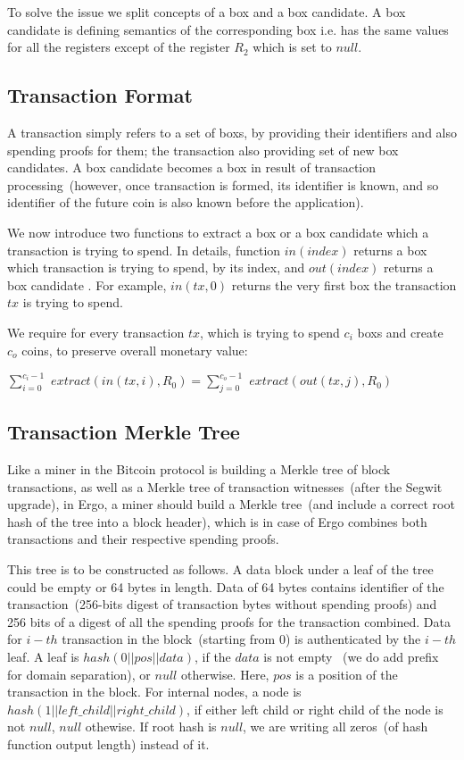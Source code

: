 \documentclass[]{article}   %
\newcommand{\coin}{box}
\newcommand{\extract}[1]{$extract({#1})$}
\begin{document}
To solve the issue we split concepts of a \coin{} and a \coin{} candidate. A \coin{} candidate is defining semantics of
the corresponding \coin{} i.e. has the same values for all the registers except of the register $R_2$ which is set to
$null$.


\subsection{Transaction Format}
\label{tx-format}

A transaction simply refers to a set of \coin{}s, by providing their identifiers and also spending proofs for
them; the transaction also providing set of new \coin{} candidates. A \coin{} candidate becomes a \coin{} in result of
transaction processing~(however, once transaction is formed, its identifier is known, and so identifier of the future
coin is also known before the application).

We now introduce two functions to extract a \coin{} or a \coin{} candidate which a transaction is trying to spend.
 In details, function $in(index)$ returns a \coin{} which transaction is trying to spend, by its index, and $out(index)$
 returns a \coin{} candidate . For example, $in(tx, 0)$ returns the very first \coin{} the transaction $tx$ is trying to spend.

We require for every transaction $tx$, which is trying to spend $c_i$ {\coin}s and create $c_o$ coins,
to preserve overall monetary value:

$ \sum_{i=0}^{c_i - 1}$ \extract{in(tx,i), R_0}$ = \sum_{j=0}^{c_o - 1}$ \extract{out(tx,j), R_0}

\subsection{Transaction Merkle Tree}
\label{tx-tree}

Like a miner in the Bitcoin protocol is building a Merkle tree of block transactions, as well as a Merkle tree of
transaction witnesses~(after the Segwit upgrade), in Ergo, a miner should build a Merkle tree~(and include a correct
 root hash of the tree into a block header), which is in case of Ergo combines both transactions and their respective
 spending proofs.

This tree is to be constructed as follows. A data block under a leaf of the tree could be empty or 64 bytes in length.
Data of 64 bytes contains identifier of the transaction~(256-bits digest of transaction bytes without spending proofs)
and 256 bits of a digest of all the spending proofs for the transaction combined. Data for $i-th$ transaction
in the block~(starting from 0) is authenticated by the $i-th$ leaf.
A leaf is $hash(0 || pos || data)$, if the $data$ is not empty
~(we do add prefix for domain separation), or $null$ otherwise. Here, $pos$ is a position of the transaction in the block.
 For internal nodes, a node is $hash(1 || left\_child || right\_child)$, if either left child or right child of the
 node is not $null$, $null$ othewise. If root hash is $null$, we are writing all zeros~(of hash function output length)
 instead of it.
\end{document}
